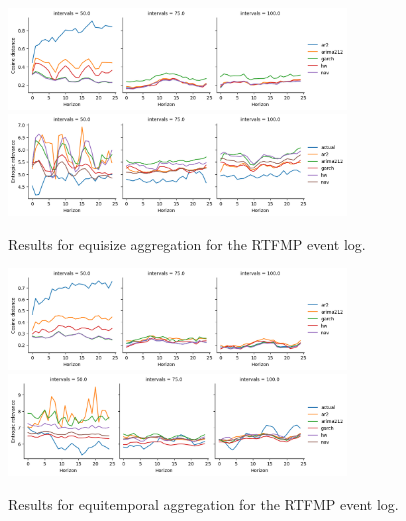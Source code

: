 \begin{figure}
    \centering
    \includegraphics[width=0.8\textwidth]{img/rtfmp_cosine_small_equisize.png}
    \includegraphics[width=0.8\textwidth]{img/rtfmp_entropic_small_equisize.png}
    \caption{Results for equisize aggregation for the RTFMP event log.}
    \label{fig:rtfmp_equisize}
\end{figure}
\begin{figure}
    \centering
    \includegraphics[width=0.8\textwidth]{img/rtfmp_cosine_small_equitemp.png}
    \includegraphics[width=0.8\textwidth]{img/rtfmp_entropic_small_equitemp.png}
    \caption{Results for equitemporal aggregation for the RTFMP event log.}
    \label{fig:rtfmp_equitemp}
\end{figure}

